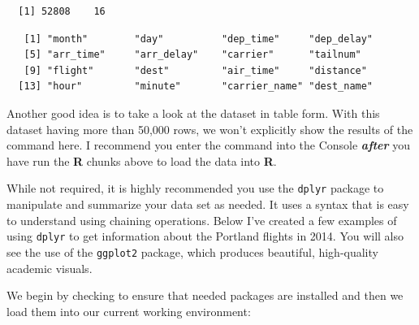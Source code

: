 \documentclass[12pt,twoside]{reedthesis}
\begin{document}
  \begin{verbatim}
  [1] 52808    16
  \end{verbatim}
  
  \begin{Shaded}
  \begin{Highlighting}[]
  \end{Highlighting}
  \end{Shaded}
  
  \begin{verbatim}
   [1] "month"        "day"          "dep_time"     "dep_delay"   
   [5] "arr_time"     "arr_delay"    "carrier"      "tailnum"     
   [9] "flight"       "dest"         "air_time"     "distance"    
  [13] "hour"         "minute"       "carrier_name" "dest_name"   
  \end{verbatim}
  
  Another good idea is to take a look at the dataset in table form. With
  this dataset having more than 50,000 rows, we won't explicitly show the
  results of the command here. I recommend you enter the command into the
  Console \textbf{\emph{after}} you have run the \textbf{R} chunks above
  to load the data into \textbf{R}.
  
  \begin{Shaded}
  \begin{Highlighting}[]
  \end{Highlighting}
  \end{Shaded}
  
  While not required, it is highly recommended you use the \texttt{dplyr}
  package to manipulate and summarize your data set as needed. It uses a
  syntax that is easy to understand using chaining operations. Below I've
  created a few examples of using \texttt{dplyr} to get information about
  the Portland flights in 2014. You will also see the use of the
  \texttt{ggplot2} package, which produces beautiful, high-quality
  academic visuals.
  
  We begin by checking to ensure that needed packages are installed and
  then we load them into our current working environment:
  
\end{document}
